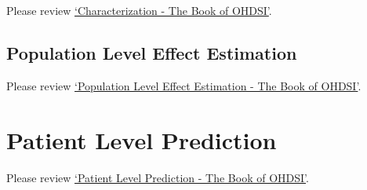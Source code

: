 \documentclass[
]{article}
\begin{document}
Please review
\href{https://ohdsi.github.io/TheBookOfOhdsi/Characterization.html}{`Characterization
- The Book of OHDSI'}.

\hypertarget{population-level-effect-estimation}{%
\subsection{Population Level Effect
Estimation}\label{population-level-effect-estimation}}

Please review
\href{https://ohdsi.github.io/TheBookOfOhdsi/PopulationLevelEstimation.html}{`Population
Level Effect Estimation - The Book of OHDSI'}.

\hypertarget{patient-level-prediction}{%
\section{Patient Level Prediction}\label{patient-level-prediction}}

Please review
\href{https://ohdsi.github.io/TheBookOfOhdsi/PatientLevelPrediction.html}{`Patient
Level Prediction - The Book of OHDSI'}.
\end{document}
